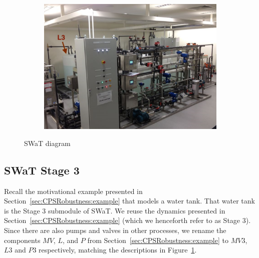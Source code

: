 {\begin{figure}[htb]
\begin{subfigure}[b]{.35\linewidth}
  \end{subfigure}
  \begin{subfigure}[b]{.35\linewidth}
  \includegraphics[width=\linewidth]{Figures/testbed2.png}
  \end{subfigure}
  
    \caption{SWaT diagram}
  \label{fig:CPSRobustness:SWaTSchema}
\end{figure}

\subsection{SWaT Stage 3}
Recall the motivational example presented in Section~\ref{sec:CPSRobustness:example} that models a water tank. That water tank is the Stage 3 submodule of SWaT. We reuse the dynamics presented in Section~\ref{sec:CPSRobustness:example} (which we henceforth refer to as Stage 3). Since there are also pumps and valves in other processes, we rename the components $MV$, $L$, and $P$ from Section~\ref{sec:CPSRobustness:example} to $MV3$, $L3$ and $P3$ respectively, matching the descriptions in Figure~\ref{fig:CPSRobustness:SWaTSchema}.

}
